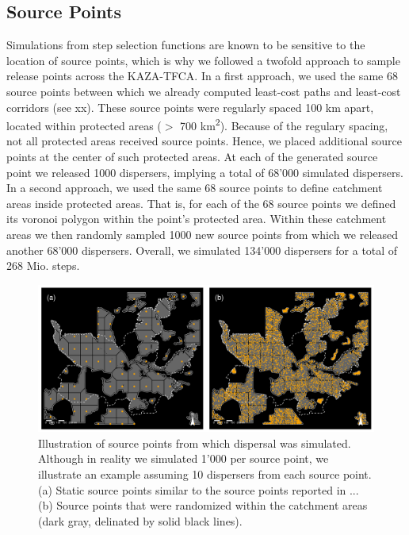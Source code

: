 \documentclass[abstract=on,10pt,a4paper,bibliography=totocnumbered]{article}
\begin{document}
\subsection{Source Points}
Simulations from step selection functions are known to be sensitive to the
location of source points, which is why we followed a twofold approach to sample
release points across the KAZA-TFCA. In a first approach, we used the same 68
source points between which we already computed least-cost paths and least-cost
corridors (see xx). These source points were regularly spaced 100 km apart,
located within protected areas (\(>\) 700 km\textsuperscript{2}). Because of
the regulary spacing, not all protected areas received source points. Hence, we
placed additional source points at the center of such protected areas. At each
of the generated source point we released 1000 dispersers, implying a total of
68'000 simulated dispersers. In a second approach, we used the same 68 source
points to define catchment areas inside protected areas. That is, for each of
the 68 source points we defined its voronoi polygon within the point's protected
area. Within these catchment areas we then randomly sampled 1000 new source
points from which we released another 68'000 dispersers. Overall, we simulated
134'000 dispersers for a total of 268 Mio. steps.

\begin{figure}[htbp]
  \begin{center}
    \includegraphics[width = \textwidth]{99_SourcePoints}
    \caption{Illustration of source points from which dispersal was simulated.
    Although in reality we simulated 1'000 per source point, we illustrate an
    example assuming 10 dispersers from each source point. (a) Static source
    points similar to the source points reported in ... (b) Source points that
    were randomized within the catchment areas (dark gray, delinated by solid
    black lines).}
    \label{SourcePoints}
  \end{center}
\end{figure}
\end{document}
